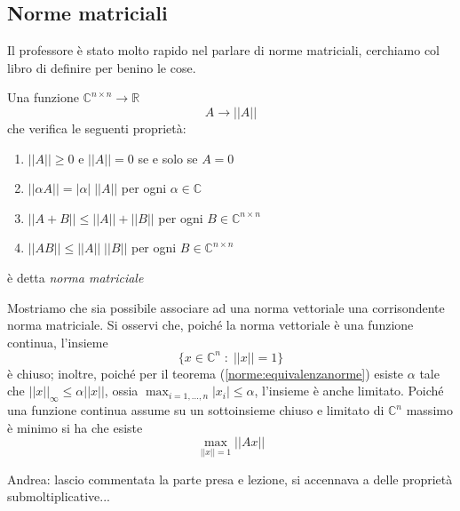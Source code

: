 \subsection{Norme matriciali}
\begin{notes}
 Il professore \`e stato molto rapido nel parlare di norme matriciali,
  cerchiamo  col libro di definire per benino le cose.
\end{notes}
\begin{defn}
Una funzione $\mathbb{C}^{n\times n} \rightarrow \mathbb{R}$
$$ A \rightarrow ||A||$$
che verifica le seguenti propriet\`a:
\begin{enumerate}
 \item $||A|| \geq 0$ e $||A||=0$ se e solo se $A=0$
 \item $||\alpha A|| = |\alpha|\; ||A||$ per ogni $\alpha \in \mathbb{C}$
 \item $||A + B|| \leq ||A|| + ||B||$ per ogni $B \in \mathbb{C}^{n \times n}$
 \item $||AB|| \leq ||A||\; ||B||$ per ogni $B \in \mathbb{C}^{n \times n}$
\end{enumerate}
\`e detta \emph{norma matriciale}
 
\end{defn}
Mostriamo che sia possibile associare ad una norma vettoriale
una corrisondente norma matriciale. Si osservi che, poich\'e la norma 
vettoriale \`e una funzione continua, l'insieme
$$ \{ x \in \mathbb{C}^{n} \; : \; ||x|| =1 \}$$
\`e chiuso; inoltre, poich\'e per il teorema (\ref{norme:equivalenzanorme}) 
esiste $\alpha$
tale che $||x||_{\infty} \leq \alpha||x||$, ossia
$\displaystyle \max_{i=1,\ldots, n} |x_i| \leq \alpha$, l'insieme
\`e anche limitato.
Poich\'e una funzione continua assume su un sottoinsieme chiuso e limitato
di $\mathbb{C}^{n}$ massimo \`e minimo si ha che esiste
$$ \displaystyle \max_{||x||=1} ||Ax||$$


\begin{notes}
Andrea: lascio commentata la parte presa e lezione, si accennava
a delle propriet\`a submoltiplicative...
% 
% 
\end{notes}

